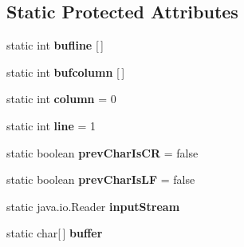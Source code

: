 \subsection*{Static Protected Attributes}
\begin{DoxyCompactItemize}
\item 
static int {\bfseries bufline} \mbox{[}$\,$\mbox{]}\hypertarget{classpack_1_1_simple_char_stream_ae6177a0816b16f716a67b3a5c1b3dce9}{}\label{classpack_1_1_simple_char_stream_ae6177a0816b16f716a67b3a5c1b3dce9}

\item 
static int {\bfseries bufcolumn} \mbox{[}$\,$\mbox{]}\hypertarget{classpack_1_1_simple_char_stream_a44171b9d34bbea1755ecab67883b38bf}{}\label{classpack_1_1_simple_char_stream_a44171b9d34bbea1755ecab67883b38bf}

\item 
static int {\bfseries column} = 0\hypertarget{classpack_1_1_simple_char_stream_a0d346e931d9630025c4d1a5bde12db82}{}\label{classpack_1_1_simple_char_stream_a0d346e931d9630025c4d1a5bde12db82}

\item 
static int {\bfseries line} = 1\hypertarget{classpack_1_1_simple_char_stream_a0213c2e0650a9113ce12c6c6632af1cc}{}\label{classpack_1_1_simple_char_stream_a0213c2e0650a9113ce12c6c6632af1cc}

\item 
static boolean {\bfseries prev\+Char\+Is\+CR} = false\hypertarget{classpack_1_1_simple_char_stream_ae17bcd64439fec5ff8afbb03dc4b8c6f}{}\label{classpack_1_1_simple_char_stream_ae17bcd64439fec5ff8afbb03dc4b8c6f}

\item 
static boolean {\bfseries prev\+Char\+Is\+LF} = false\hypertarget{classpack_1_1_simple_char_stream_a6864b45cf6bbc9f3c370cc490d6941d7}{}\label{classpack_1_1_simple_char_stream_a6864b45cf6bbc9f3c370cc490d6941d7}

\item 
static java.\+io.\+Reader {\bfseries input\+Stream}\hypertarget{classpack_1_1_simple_char_stream_a8b48f2389729e9269304522d46df3e26}{}\label{classpack_1_1_simple_char_stream_a8b48f2389729e9269304522d46df3e26}

\item 
static char\mbox{[}$\,$\mbox{]} {\bfseries buffer}\hypertarget{classpack_1_1_simple_char_stream_a304f9ad99b7cdb50017d0644666343ad}{}\label{classpack_1_1_simple_char_stream_a304f9ad99b7cdb50017d0644666343ad}


\end{DoxyCompactItemize}

